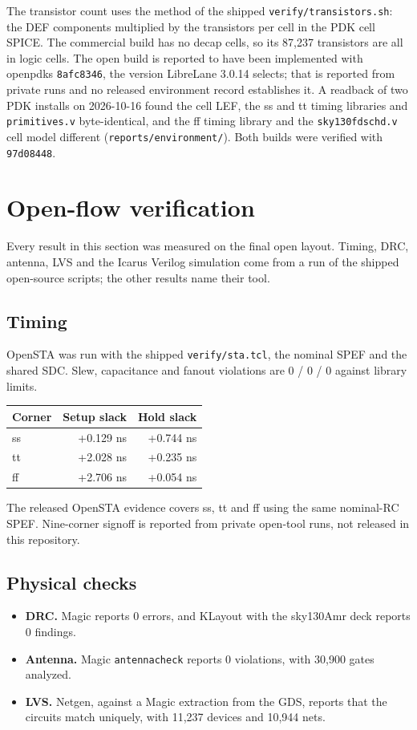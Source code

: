 \documentclass[11pt,letterpaper]{article}
\newcommand{\sk}[1]{\texttt{#1}}
\renewcommand{\_}{\textunderscore\penalty0\hskip0pt\relax}
\begin{document}
The transistor count uses the method of the shipped \sk{verify/transistors.sh}: the DEF components multiplied by the transistors per cell in the PDK cell SPICE. The commercial build has no decap cells, so its 87,237 transistors are all in logic cells. The open build is reported to have been implemented with open\_pdks \sk{8afc8346}, the version LibreLane 3.0.14 selects; that is reported from private runs and no released environment record establishes it. A readback of two PDK installs on 2026-10-16 found the cell LEF, the ss and tt timing libraries and \sk{primitives.v} byte-identical, and the ff timing library and the \sk{sky130\_fd\_sc\_hd.v} cell model different (\sk{reports/environment/}). Both builds were verified with \sk{97d08448}.

\section{Open-flow verification}\label{sec:openverify}
Every result in this section was measured on the final open layout. Timing, DRC, antenna, LVS and the Icarus Verilog simulation come from a run of the shipped open-source scripts; the other results name their tool.

\subsection*{Timing}
OpenSTA was run with the shipped \sk{verify/sta.tcl}, the nominal SPEF and the shared SDC. Slew, capacitance and fanout violations are 0 / 0 / 0 against library limits.

\begin{center}
\begin{tabular}{@{}lrr@{}}
\toprule
Corner & Setup slack & Hold slack\\
\midrule
ss & +0.129 ns & +0.744 ns\\
tt & +2.028 ns & +0.235 ns\\
ff & +2.706 ns & +0.054 ns\\
\bottomrule
\end{tabular}
\end{center}

The released OpenSTA evidence covers ss, tt and ff using the same nominal-RC SPEF. Nine-corner signoff is reported from private open-tool runs, not released in this repository.

\subsection*{Physical checks}
\begin{itemize}
\item \textbf{DRC.} Magic reports 0 errors, and KLayout with the sky130A\_mr deck reports 0 findings.
\item \textbf{Antenna.} Magic \sk{antennacheck} reports 0 violations, with 30,900 gates analyzed.
\item \textbf{LVS.} Netgen, against a Magic extraction from the GDS, reports that the circuits match uniquely, with 11,237 devices and 10,944 nets.
\end{itemize}
\end{document}
